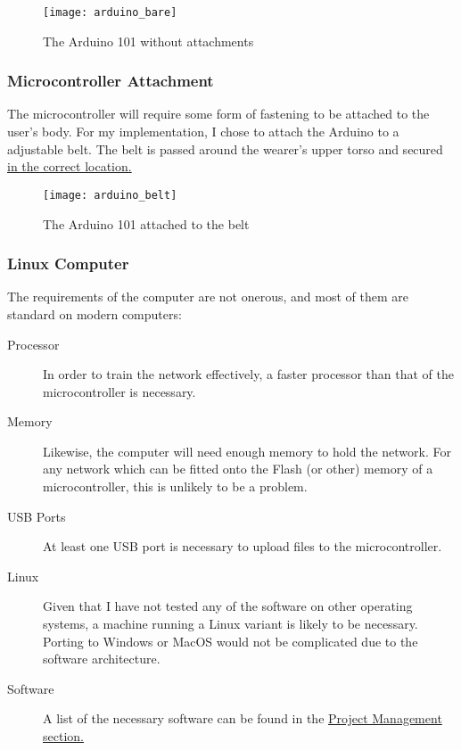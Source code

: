\documentclass[a4paper]{article}
\begin{document}
\begin{figure}[H]
    \centering
        \texttt{[image: arduino\_bare]}
        \caption{The Arduino 101 without attachments}
        \label{fig:ar_bare}
\end{figure}

\subsubsection{Microcontroller Attachment}

The microcontroller will require some form of fastening to be attached to the user's body. For my implementation, I chose to attach the Arduino to a adjustable belt. The belt is passed around the wearer's upper torso and secured \hyperref[subsubsec:dc_dc_placement]{in the correct location.}

\begin{figure}[H]
    \centering
        \texttt{[image: arduino\_belt]}
        \caption{The Arduino 101 attached to the belt}
        \label{fig:ar_belt}
\end{figure}

\newpage
\subsubsection{Linux Computer}

The requirements of the computer are not onerous, and most of them are standard on modern computers:

\begin{description}
\item[Processor] In order to train the network effectively, a faster processor than that of the microcontroller is necessary. 
\item[Memory] Likewise, the computer will need enough memory to hold the network. For any network which can be fitted onto the Flash (or other) memory of a microcontroller, this is unlikely to be a problem.
\item[USB Ports] At least one USB port is necessary to upload files to the microcontroller.
\item[Linux] Given that I have not tested any of the software on other operating systems, a machine running a Linux variant is likely to be necessary. Porting to Windows or MacOS would not be complicated due to the software architecture.
\item[Software] A list of the necessary software can be found in the \hyperref[subsec:pp_ll]{Project Management section.}
\end{description}
\end{document}
